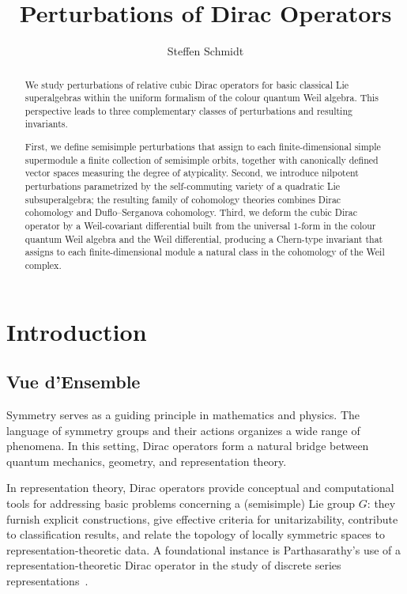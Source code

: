 \documentclass[11pt]{amsart}
\title{Perturbations of Dirac Operators}
\author{Steffen Schmidt}
\theoremstyle{plain}
\theoremstyle{remark}
\theoremstyle{definition}
\numberwithin{equation}{section}
\theoremstyle{remark}
\let\origmaketitle\maketitle
\def\maketitle{
  \begingroup
  \def\uppercasenonmath##1{} %
  \let\MakeUppercase\relax %
  \origmaketitle
  \endgroup
}
\begin{document}
\addtolength{\oddsidemargin}{-0.8cm}
\addtolength{\evensidemargin}{-0.8cm}
\begin{abstract}
We study perturbations of relative cubic Dirac operators for basic classical Lie superalgebras within the uniform formalism of the colour quantum Weil algebra. This perspective leads to three complementary classes of perturbations and resulting invariants.

First, we define semisimple perturbations that assign to each finite-dimensional simple supermodule a finite collection of semisimple orbits, together with canonically defined vector spaces measuring the degree of atypicality. Second, we introduce nilpotent perturbations
parametrized by the self-commuting variety of a quadratic Lie subsuperalgebra; the
resulting family of cohomology theories combines Dirac cohomology and
Duflo--Serganova cohomology.  Third, we deform the cubic Dirac operator by a
Weil-covariant differential built from the universal $1$-form in the colour quantum Weil algebra
and the Weil differential, producing a Chern-type invariant that assigns to each
finite-dimensional module a natural class in the cohomology of the Weil
complex.
\end{abstract}

\maketitle
\setlength{\parindent}{1em}
\setcounter{tocdepth}{1}

\tableofcontents

\section{Introduction}
\subsection{Vue d'Ensemble}
Symmetry serves as a guiding principle in mathematics and physics. The language of symmetry groups and their actions
organizes a wide range of phenomena. In this setting, Dirac operators form a
natural bridge between quantum mechanics, geometry, and representation theory.

In representation theory, Dirac operators provide conceptual and computational tools
for addressing basic problems concerning a (semisimple) Lie group $G$: they furnish explicit constructions,
give effective criteria for unitarizability, contribute to classification results, and
relate the topology of locally symmetric spaces to representation-theoretic data.
A foundational instance is Parthasarathy's use of a representation-theoretic Dirac
operator in the study of discrete series representations~\cite{parthasarathy1972dirac}.
\end{document}
